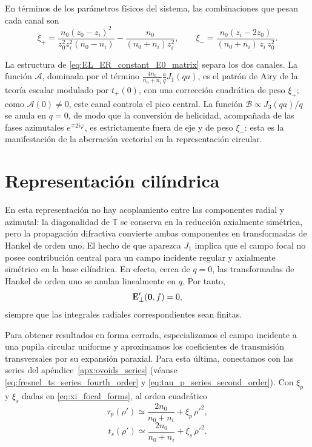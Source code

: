 En términos de los parámetros físicos del sistema, las combinaciones que pesan cada canal son
\begin{equation}
  \xi_+
  =
  \frac{
    n_0(z_0-z_i)^2
  }{
    z_0^2 z_i^2 (n_0-n_i)
  }
  -
  \frac{n_0}{(n_0+n_i)z_i^2},
  \qquad
  \xi_-
  =
  \frac{
    n_0(z_i-2z_0)
  }{
    (n_0+n_i)\,z_i\,z_0^2
  }.
  \label{eq:xi_combinations_physical}
\end{equation}

La estructura de \eqref{eq:EL_ER_constant_E0_matrix} separa los dos canales. La función $\mathcal A$, dominada por el término $\tfrac{4n_0}{n_0+n_i}\tfrac{a}{q}J_1(qa)$, es el patrón de Airy de la teoría escalar modulado por $t_+(0)$, con una corrección cuadrática de peso $\xi_+$; como $\mathcal A(0)\neq 0$, este canal controla el pico central. La función $\mathcal B\propto J_3(qa)/q$ se anula en $q=0$, de modo que la conversión de helicidad, acompañada de las fases azimutales $e^{\mp 2i\varphi}$, es estrictamente fuera de eje y de peso $\xi_-$: esta es la manifestación de la aberración vectorial en la representación circular.

\section{Representación cilíndrica}

En esta representación no hay acoplamiento entre las componentes radial y azimutal: la diagonalidad de \(\mathbb T\) se conserva en la reducción axialmente simétrica, pero la propagación difractiva convierte ambas componentes en transformadas de Hankel de orden uno. El hecho de que aparezca \(J_1\) implica que el campo focal no posee contribución central para un campo incidente regular y axialmente simétrico en la base cilíndrica. En efecto, cerca de \(q=0\), las transformadas de Hankel de orden uno se anulan linealmente en \(q\). Por tanto,
\begin{equation}
  \vb E'_\perp(\vb 0,f)=0,
\end{equation}
siempre que las integrales radiales correspondientes sean finitas.

Para obtener resultados en forma cerrada, especializamos el campo incidente a una pupila circular uniforme y aproximamos los coeficientes de transmisión transversales por su expansión paraxial. Para esta última, conectamos con las series del apéndice~\ref{apx:ovoids_series} (véanse \eqref{eq:fresnel_ts_series_fourth_order} y \eqref{eq:tau_p_series_second_order}). Con $\xi_p$ y $\xi_s$ dadas en \eqref{eq:xi_focal_forms}, al orden cuadrático
\begin{equation}
  \tau_p(\rho')
  \simeq
  \frac{2n_0}{n_0+n_i}
  +
  \xi_p\,\rho'^2,
  \label{eq:tp_paraxial_cylindrical}
\end{equation}
\begin{equation}
  t_s(\rho')
  \simeq
  \frac{2n_0}{n_0+n_i}
  +
  \xi_s\,\rho'^2.
  \label{eq:ts_paraxial_cylindrical}
\end{equation}

